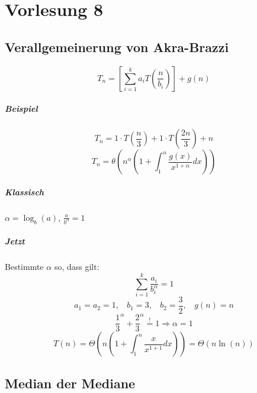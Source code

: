 \chapter{Vorlesung 8}


\section{Verallgemeinerung von Akra-Brazzi}

\[T_n = [\sum_{i=1}^k a_i T(\frac{n}{b_i})] + g(n) \]
\paragraph{Beispiel}
\[T_n = 1\cdot T(\frac{n}{3})+1\cdot T(\frac{2n}{3}) + n \]
\[T_n = \theta(n^{\alpha}(1+\int_1^n\frac{g(x)}{x^{1+\alpha}} dx))  \]

\paragraph{Klassisch} $\alpha = \log_b(a)$, $\frac{a}{b^{\alpha}} = 1$
\paragraph{Jetzt} Bestimmte $\alpha$ so, dass gilt:
\[\sum_{i=1}^k \frac{a_i}{b_i^{\alpha}} = 1 \]
\[a_1 = a_2 = 1, ~~~~ b_1 = 3, ~~~~ b_2 = \frac{3}{2}, ~~~~ g(n) = n \]
 \[\frac{1}{3}^{\alpha} + \frac{2}{3}^{\alpha} \overset{!}{=} 1 \Rightarrow \alpha = 1 \]
\[T(n) = \Theta(n(1+\int_1^n \frac{x}{x^{1+1}} dx)) = \Theta(n\ln(n)) \]


\section{Median der Mediane}

